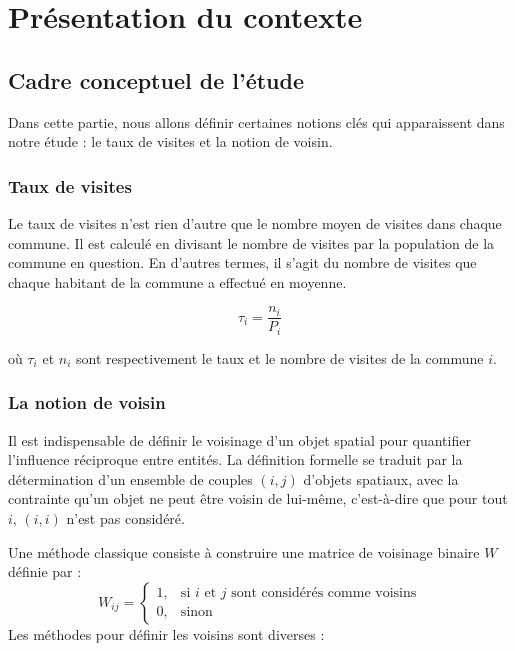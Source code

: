 \documentclass[
]{article}
\author{}
\date{\vspace{-2.5em}}
\begin{document}
\section{Présentation du contexte}\label{pruxe9sentation-du-contexte}

\subsection{Cadre conceptuel de
l'étude}\label{cadre-conceptuel-de-luxe9tude}

Dans cette partie, nous allons définir certaines notions clés qui
apparaissent dans notre étude : le taux de visites et la notion de
voisin.

\subsubsection{Taux de visites}\label{taux-de-visites}

Le taux de visites n'est rien d'autre que le nombre moyen de visites
dans chaque commune. Il est calculé en divisant le nombre de visites par
la population de la commune en question. En d'autres termes, il s'agit
du nombre de visites que chaque habitant de la commune a effectué en
moyenne.

\[\tau_i = \frac{n_i}{P_i}\]

où \(\tau_i\) et \(n_i\) sont respectivement le taux et le nombre de
visites de la commune \(i\).

\subsubsection{La notion de voisin}\label{la-notion-de-voisin}

Il est indispensable de définir le voisinage d'un objet spatial pour
quantifier l'influence réciproque entre entités. La définition formelle
se traduit par la détermination d'un ensemble de couples \((i,j)\)
d'objets spatiaux, avec la contrainte qu'un objet ne peut être voisin de
lui-même, c'est-à-dire que pour tout \(i\), \((i,i)\) n'est pas
considéré.

Une méthode classique consiste à construire une matrice de voisinage
binaire \(W\) définie par : \[
W_{ij} = \begin{cases} 
1, & \text{si } i \text{ et } j \text{ sont considérés comme voisins} \\
0, & \text{sinon}
\end{cases}
\] Les méthodes pour définir les voisins sont diverses :
\end{document}
